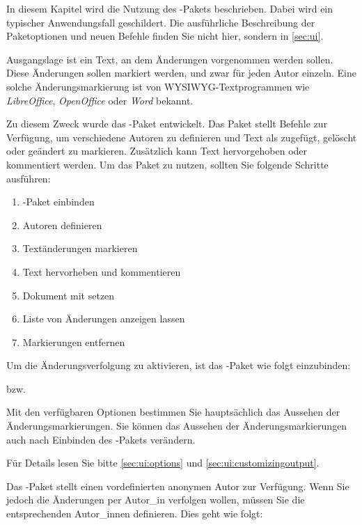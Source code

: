 In diesem Kapitel wird die Nutzung des -Pakets beschrieben.
Dabei wird ein typischer Anwendungsfall geschildert.
Die ausführliche Beschreibung der Paketoptionen und neuen Befehle finden Sie nicht hier, sondern in \autoref{sec:ui}.

Ausgangslage ist ein Text, an dem Änderungen vorgenommen werden sollen.
Diese Änderungen sollen markiert werden, und zwar für jeden Autor einzeln.
Eine solche Änderungsmarkierung ist \zB von WYSIWYG-Textprogrammen wie \emph{LibreOffice}, \emph{OpenOffice} oder \emph{Word} bekannt.

Zu diesem Zweck wurde das -Paket entwickelt.
Das Paket stellt Befehle zur Verfügung, um verschiedene Autoren zu definieren und Text als zugefügt, gelöscht oder geändert zu markieren.
Zusätzlich kann Text hervorgehoben oder kommentiert werden.
Um das Paket zu nutzen, sollten Sie folgende Schritte ausführen:

\begin{enumerate}
	\item {}-Paket einbinden
	\item Autoren definieren
	\item Textänderungen markieren
	\item Text hervorheben und kommentieren
	\item Dokument mit  setzen
	\item Liste von Änderungen anzeigen lassen
	\item Markierungen entfernen
\end{enumerate}


Um die Änderungsverfolgung zu aktivieren, ist das -Paket wie folgt einzubinden:


bzw.


Mit den verfügbaren Optionen bestimmen Sie hauptsächlich das Aussehen der Änderungsmarkierungen.
Sie können das Aussehen der Änderungsmarkierungen auch nach Einbinden des -Pakets verändern.

Für Details lesen Sie bitte \autoref{sec:ui:options} und \autoref{sec:ui:customizingoutput}.


Das -Paket stellt einen vordefinierten anonymen Autor zur Verfügung.
Wenn Sie jedoch die Änderungen per Autor\_in verfolgen wollen, müssen Sie die entsprechenden Autor\_innen definieren.
Dies geht wie folgt:

